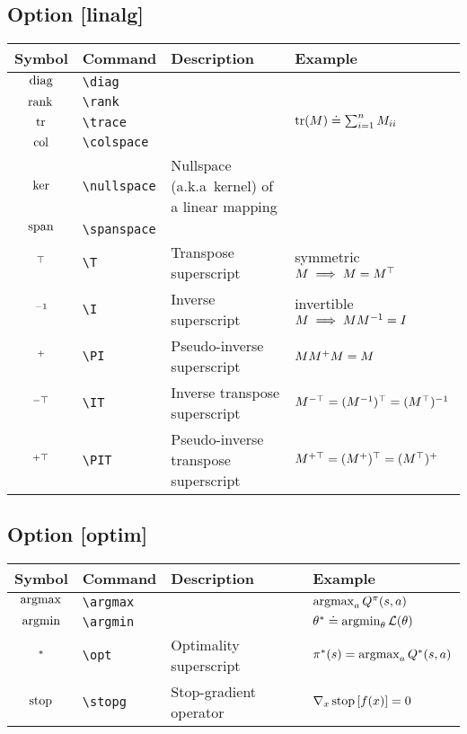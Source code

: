 \documentclass{article}
\begin{document}
\subsection*{Option [linalg]}

\begin{tabular}{clll}
  \toprule
  Symbol & Command & Description & Example \\
  \midrule
  $\operatorname*{diag}$ & \verb|\diag| & & \\
  $\operatorname*{rank}$ & \verb|\rank| & & \\
  $\operatorname*{tr}$ & \verb|\trace| & & $\operatorname*{tr}(M) \doteq \sum_{i=1}^n M_{ii}$ \\
  $\operatorname*{col}$ & \verb|\colspace| & & \\
  $\operatorname*{ker}$ & \verb|\nullspace| & Nullspace (a.k.a\ kernel) of a linear mapping & \\
  $\operatorname*{span}$ & \verb|\spanspace| & & \\
  $^\top$ & \verb|\T| & Transpose superscript & symmetric $M \implies M = M^\top$ \\
  $^{-1}$ & \verb|\I| & Inverse superscript & invertible $M \implies MM^{-1} = I$ \\
  $^{+}$ & \verb|\PI| & Pseudo-inverse superscript & $MM^{+} M = M$ \\
  $^{-\top}$ & \verb|\IT| & Inverse transpose superscript & $M^{-\top} = (M^{-1})^\top = (M^\top)^{-1}$ \\
  $^{+\top}$ & \verb|\PIT| & Pseudo-inverse transpose superscript & $M^{+\top} = (M^{+})^\top = (M^\top)^{+}$ \\
  \bottomrule
\end{tabular}

\subsection*{Option [optim]}

\begin{tabular}{clll}
  \toprule
  Symbol & Command & Description & Example \\
  \midrule
  $\operatorname*{argmax}$ & \verb|\argmax| & & $\operatorname*{argmax}_a Q^{\pi}(s, a)$ \\
  $\operatorname*{argmin}$ & \verb|\argmin| & & $\theta^{*} \doteq \operatorname*{argmin}_\theta \mathcal{L}(\theta)$ \\
  $^{*}$ & \verb|\opt| & Optimality superscript & $\pi^{*}(s) = \operatorname*{argmax}_a Q^{*}(s, a)$ \\
  \midrule
  $\operatorname*{stop}$ & \verb|\stopg| & Stop-gradient operator & $\nabla_x \operatorname*{stop}\left[ f(x) \right] = 0$ \\
  \bottomrule
\end{tabular}
\end{document}
